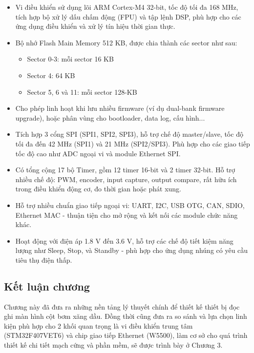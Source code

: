 \begin{itemize}
    \item Vi điều khiển sử dụng lõi ARM Cortex-M4 32-bit, tốc độ tối đa 168 MHz, tích hợp bộ xử lý dấu chấm động (FPU) và tập lệnh DSP, phù hợp cho các ứng dụng điều khiển và xử lý tín hiệu thời gian thực.
    
    \item Bộ nhớ Flash Main Memory 512 KB, được chia thành các sector như sau:  
    
    \begin{itemize}
        \item Sector 0-3: mỗi sector 16 KB  
        \item Sector 4: 64 KB  
        \item Sector 5, 6 và 11: mỗi sector 128-KB  
    \end{itemize}

    \item Cho phép linh hoạt khi lưu nhiều firmware (ví dụ dual-bank firmware upgrade), hoặc phân vùng cho bootloader, data log, cấu hình...

    \item Tích hợp 3 cổng SPI (SPI1, SPI2, SPI3), hỗ trợ chế độ master/slave, tốc độ tối đa đến 42 MHz (SPI1) và 21 MHz (SPI2/SPI3). Phù hợp cho các giao tiếp tốc độ cao như ADC ngoại vi và module Ethernet SPI.

    \item Có tổng cộng 17 bộ Timer, gồm 12 timer 16-bit và 2 timer 32-bit. Hỗ trợ nhiều chế độ: PWM, encoder, input capture, output compare, rất hữu ích trong điều khiển động cơ, đo thời gian hoặc phát xung.

    \item Hỗ trợ nhiều chuẩn giao tiếp ngoại vi: UART, I2C, USB OTG, CAN, SDIO, Ethernet MAC - thuận tiện cho mở rộng và kết nối các module chức năng khác.

    \item Hoạt động với điện áp 1.8 V đến 3.6 V, hỗ trợ các chế độ tiết kiệm năng lượng như Sleep, Stop, và Standby - phù hợp cho ứng dụng nhúng có yêu cầu tiêu thụ điện thấp.
\end{itemize}

\subsection{Kết luận chương} Chương này đã đưa ra những nền tảng lý thuyết chính để thiết kế thiết bị đọc ghi màn hình cột bơm xăng dầu. Đồng thời cũng đưa ra so sánh và lựa chọn linh kiện phù hợp cho 2 khối quan trọng là vi điều khiển trung tâm (STM32F407VET6) và chip giao tiếp Ethernet (W5500), làm cơ sở cho quá trình thiết kế chi tiết mạch cứng và phần mềm, sẽ được trình bày ở Chương 3.
